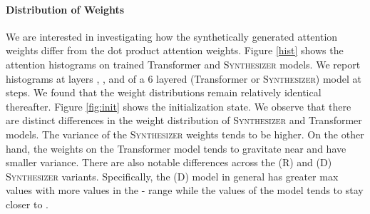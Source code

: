 \documentclass{article}
\begin{document}
\paragraph{Distribution of Weights} We are interested in investigating how the synthetically generated attention weights differ from the dot product attention weights. Figure \ref{hist} shows the attention histograms on trained Transformer and \textsc{Synthesizer} models. We report histograms at layers , , and  of a 6 layered (Transformer or \textsc{Synthesizer}) model at  steps. We found that the weight distributions remain relatively identical thereafter. Figure \ref{fig:init} shows the initialization state. We observe that there are distinct differences in the weight distribution of \textsc{Synthesizer} and Transformer models. The variance of the \textsc{Synthesizer} weights tends to be higher. On the other hand, the weights on the Transformer model tends to gravitate near  and have smaller variance. There are also notable differences across the (R) and (D) \textsc{Synthesizer} variants. Specifically, the (D) model in general has greater max values with more values in the - range while the values of the  model tends to stay closer to .
\end{document}
